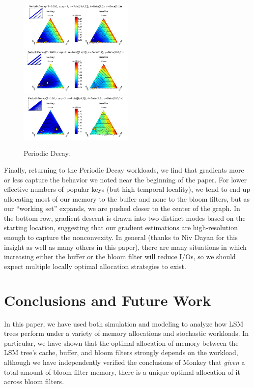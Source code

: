 \documentclass{sig-alternate-05-2015}
\begin{document}
\begin{figure}[!htb]
\begin{center}
\includegraphics[width=0.5\textwidth]{periodquiv3.png}
\includegraphics[width=0.5\textwidth]{periodquiv2.png}
\includegraphics[width=0.5\textwidth]{periodquiv1.png}
\end{center}
\caption{Periodic Decay.}
\label{fig:periodquiv}
\end{figure}

Finally, returning to the Periodic Decay workloads, we find that gradients more
or less capture the behavior we noted near the beginning of the paper. For
lower effective numbers of popular keys (but high temporal locality), we tend
to end up allocating most of our memory to the buffer and none to the bloom
filters, but as our ``working set'' expands, we are pushed closer to the center
of the graph. In the bottom row, gradient descent is drawn into two distinct
modes based on the starting location, suggesting that our gradient estimations
are high-resolution enough to capture the nonconvexity. In general (thanks to
Niv Dayan for this insight as well as many others in this paper), there are
many situations in which increasing either the buffer or the bloom filter will
reduce I/Os, so we should expect multiple locally optimal allocation strategies
to exist.

\section{Conclusions and Future Work}

In this paper, we have used both simulation and modeling to analyze how LSM
trees perform under a variety of memory allocations and stochastic workloads.
In particular, we have shown that the optimal allocation of memory between the
LSM tree's cache, buffer, and bloom filters strongly depends on the workload,
although we have independently verified the conclusions of Monkey \cite{monkey}
that \textit{given} a total amount of bloom filter memory, there is a unique
optimal allocation of it across bloom filters.
\end{document}
